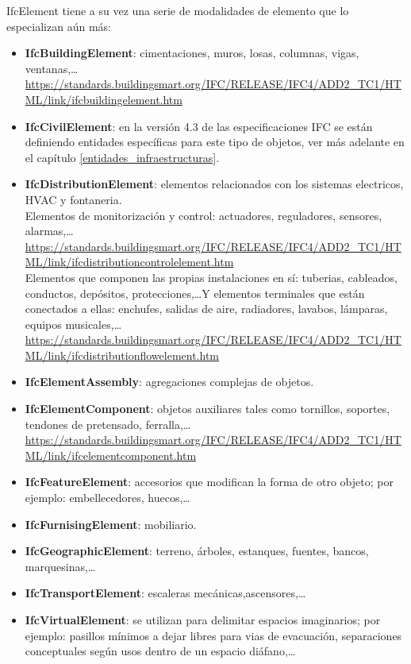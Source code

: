 \documentclass[spanish,12pt,a4paper,final,oneside]{book}
\begin{document}
\begin{itemize}
\vspace{0.3cm}
IfcElement tiene a su vez una serie de modalidades de elemento que lo especializan aún más:
\begin{itemize}
\item \textbf{IfcBuildingElement}: cimentaciones, muros, losas, columnas, vigas, ventanas,\ldots
\\ \url{https://standards.buildingsmart.org/IFC/RELEASE/IFC4/ADD2_TC1/HTML/link/ifcbuildingelement.htm}
\item \textbf{IfcCivilElement}: en la versión 4.3 de las especificaciones IFC se están definiendo entidades específicas para este tipo de objetos, ver más adelante en el capítulo \ref{entidades_infraestructuras}.
\item \textbf{IfcDistributionElement}: elementos relacionados con los sistemas electricos, HVAC y fontaneria.
\\Elementos de monitorización y control: actuadores, reguladores, sensores, alarmas,\ldots 
\\ \url{https://standards.buildingsmart.org/IFC/RELEASE/IFC4/ADD2_TC1/HTML/link/ifcdistributioncontrolelement.htm}
\\Elementos que componen las propias instalaciones en sí: tuberias, cableados, conductos, depósitos, protecciones,\ldots Y  elementos terminales que están conectados a ellas: enchufes, salidas de aire, radiadores, lavabos, lámparas, equipos musicales,\ldots
\\ \url{https://standards.buildingsmart.org/IFC/RELEASE/IFC4/ADD2_TC1/HTML/link/ifcdistributionflowelement.htm}
\item \textbf{IfcElementAssembly}: agregaciones complejas de objetos.
\item \textbf{IfcElementComponent}: objetos auxiliares tales como tornillos, soportes, tendones de pretensado, ferralla,\ldots
\\ \url{https://standards.buildingsmart.org/IFC/RELEASE/IFC4/ADD2_TC1/HTML/link/ifcelementcomponent.htm}
\item \textbf{IfcFeatureElement}: accesorios que modifican la forma de otro objeto; por ejemplo: embellecedores, huecos,\ldots
\item \textbf{IfcFurnisingElement}: mobiliario.
\item \textbf{IfcGeographicElement}: terreno, árboles, estanques, fuentes, bancos, marquesinas,\ldots 
\item \textbf{IfcTransportElement}: escaleras mecánicas,ascensores,\ldots
\item \textbf{IfcVirtualElement}: se utilizan para delimitar espacios imaginarios; por ejemplo: pasillos mínimos a dejar libres para vias de evacuación, separaciones conceptuales según usos dentro de un espacio diáfano,\ldots
\end{itemize}


\end{itemize}
\end{document}
